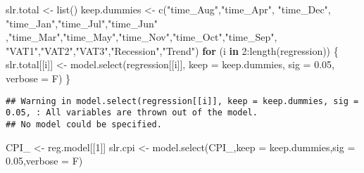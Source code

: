 \documentclass[
]{article}
\newenvironment{Shaded}{\begin{snugshade}}{\end{snugshade}}
\newcommand{\AttributeTok}[1]{\textcolor[rgb]{0.77,0.63,0.00}{#1}}
\newcommand{\ControlFlowTok}[1]{\textcolor[rgb]{0.13,0.29,0.53}{\textbf{#1}}}
\newcommand{\DecValTok}[1]{\textcolor[rgb]{0.00,0.00,0.81}{#1}}
\newcommand{\FloatTok}[1]{\textcolor[rgb]{0.00,0.00,0.81}{#1}}
\newcommand{\FunctionTok}[1]{\textcolor[rgb]{0.00,0.00,0.00}{#1}}
\newcommand{\NormalTok}[1]{#1}
\newcommand{\OtherTok}[1]{\textcolor[rgb]{0.56,0.35,0.01}{#1}}
\newcommand{\SpecialCharTok}[1]{\textcolor[rgb]{0.00,0.00,0.00}{#1}}
\newcommand{\StringTok}[1]{\textcolor[rgb]{0.31,0.60,0.02}{#1}}
\begin{document}
\begin{Shaded}
\begin{Highlighting}[]
\NormalTok{slr.total }\OtherTok{\textless{}{-}} \FunctionTok{list}\NormalTok{()}
\NormalTok{keep.dummies }\OtherTok{\textless{}{-}} \FunctionTok{c}\NormalTok{(}\StringTok{"time\_Aug"}\NormalTok{,}\StringTok{"time\_Apr"}\NormalTok{,}
                  \StringTok{"time\_Dec"}\NormalTok{,  }\StringTok{"time\_Jan"}\NormalTok{,}\StringTok{"time\_Jul"}\NormalTok{,}\StringTok{"time\_Jun"}\NormalTok{ ,}\StringTok{"time\_Mar"}\NormalTok{,}\StringTok{"time\_May"}\NormalTok{,}\StringTok{"time\_Nov"}\NormalTok{,}\StringTok{"time\_Oct"}\NormalTok{,}\StringTok{"time\_Sep"}\NormalTok{,}
                  \StringTok{"VAT1"}\NormalTok{,}\StringTok{"VAT2"}\NormalTok{,}\StringTok{"VAT3"}\NormalTok{,}\StringTok{"Recession"}\NormalTok{,}\StringTok{"Trend"}\NormalTok{)}
\ControlFlowTok{for}\NormalTok{ (i }\ControlFlowTok{in} \DecValTok{2}\SpecialCharTok{:}\FunctionTok{length}\NormalTok{(regression)) \{}
\NormalTok{  slr.total[[i]] }\OtherTok{\textless{}{-}} 
    \FunctionTok{model.select}\NormalTok{(regression[[i]], }\AttributeTok{keep =}\NormalTok{ keep.dummies, }\AttributeTok{sig =} \FloatTok{0.05}\NormalTok{, }\AttributeTok{verbose =}\NormalTok{ F)}
\NormalTok{\}}
\end{Highlighting}
\end{Shaded}

\begin{verbatim}
## Warning in model.select(regression[[i]], keep = keep.dummies, sig = 0.05, : All variables are thrown out of the model.
## No model could be specified.
\end{verbatim}

\begin{Shaded}
\begin{Highlighting}[]
\NormalTok{CPI\_ }\OtherTok{\textless{}{-}}\NormalTok{ reg.model[[}\DecValTok{1}\NormalTok{]]}
\NormalTok{slr.cpi }\OtherTok{\textless{}{-}} \FunctionTok{model.select}\NormalTok{(CPI\_,}\AttributeTok{keep =}\NormalTok{ keep.dummies,}\AttributeTok{sig =} \FloatTok{0.05}\NormalTok{,}\AttributeTok{verbose =}\NormalTok{ F)}
\end{Highlighting}
\end{Shaded}
\end{document}
